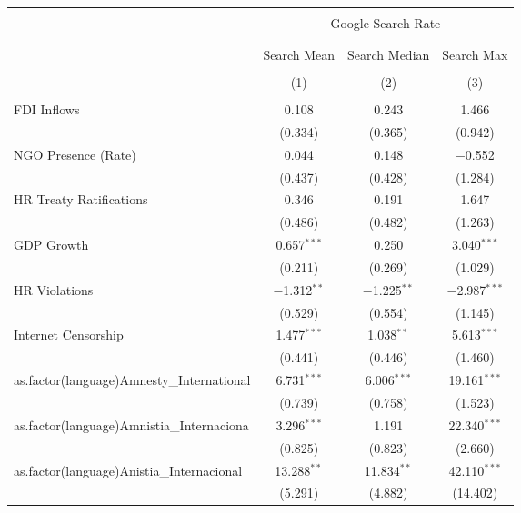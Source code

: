 
\begin{table}[!htbp] \centering 
  \caption{} 
  \label{} 
\begin{tabular}{@{\extracolsep{5pt}}lccc} 
\\[-1.8ex]\hline 
\hline \\[-1.8ex] 
 & \multicolumn{3}{c}{Google Search Rate} \\ 
\cline{2-4} 
\\[-1.8ex] & \multicolumn{3}{c}{ } \\ 
 & Search Mean & Search Median & Search Max \\ 
\\[-1.8ex] & (1) & (2) & (3)\\ 
\hline \\[-1.8ex] 
 FDI Inflows & 0.108 & 0.243 & 1.466 \\ 
  & (0.334) & (0.365) & (0.942) \\ 
  NGO Presence (Rate) & 0.044 & 0.148 & $-$0.552 \\ 
  & (0.437) & (0.428) & (1.284) \\ 
  HR Treaty Ratifications & 0.346 & 0.191 & 1.647 \\ 
  & (0.486) & (0.482) & (1.263) \\ 
  GDP Growth & 0.657$^{***}$ & 0.250 & 3.040$^{***}$ \\ 
  & (0.211) & (0.269) & (1.029) \\ 
  HR Violations & $-$1.312$^{**}$ & $-$1.225$^{**}$ & $-$2.987$^{***}$ \\ 
  & (0.529) & (0.554) & (1.145) \\ 
  Internet Censorship & 1.477$^{***}$ & 1.038$^{**}$ & 5.613$^{***}$ \\ 
  & (0.441) & (0.446) & (1.460) \\ 
  as.factor(language)Amnesty\_International & 6.731$^{***}$ & 6.006$^{***}$ & 19.161$^{***}$ \\ 
  & (0.739) & (0.758) & (1.523) \\ 
  as.factor(language)Amnistia\_Internaciona & 3.296$^{***}$ & 1.191 & 22.340$^{***}$ \\ 
  & (0.825) & (0.823) & (2.660) \\ 
  as.factor(language)Anistia\_Internacional & 13.288$^{**}$ & 11.834$^{**}$ & 42.110$^{***}$ \\ 
  & (5.291) & (4.882) & (14.402) \\ 

\end{tabular}
\end{table}
